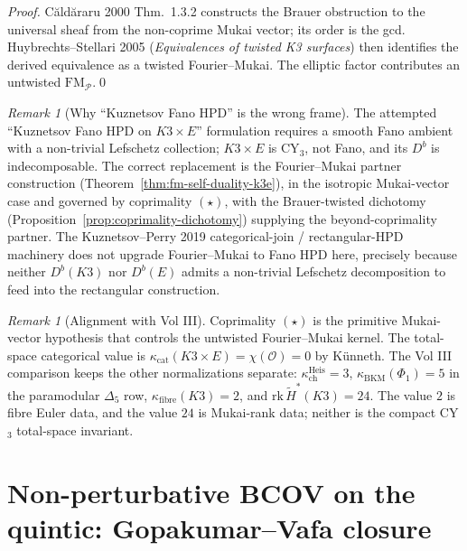\documentclass[12pt]{amsart}
\theoremstyle{remark}
\newtheorem{rmk}[thm]{Remark}
\providecommand{\cO}{\mathcal{O}}
\begin{document}
\begin{proof}
  C\u{a}ld\u{a}raru 2000 Thm.\ 1.3.2 constructs the Brauer obstruction
  to the universal sheaf from the non-coprime Mukai vector; its order
  is the gcd. Huybrechts--Stellari 2005 (\emph{Equivalences of twisted
  K3 surfaces}) then identifies the derived equivalence as a twisted
  Fourier--Mukai. The elliptic factor contributes an untwisted
  $\mathrm{FM}_{\mathcal{P}}$.\qed
\end{proof}

\begin{rmk}[Why ``Kuznetsov Fano HPD'' is the wrong frame]
  The attempted ``Kuznetsov Fano HPD on $K3
  \times E$'' formulation requires a smooth Fano ambient
  with a non-trivial Lefschetz collection; $K3 \times E$ is CY$_3$,
  not Fano, and its $D^b$ is indecomposable. The correct replacement is
  the Fourier--Mukai partner construction
  (Theorem~\ref{thm:fm-self-duality-k3e}), in the isotropic
  Mukai-vector case and governed by coprimality $(\star)$, with the
  Brauer-twisted dichotomy
  (Proposition~\ref{prop:coprimality-dichotomy}) supplying the
  beyond-coprimality partner. The Kuznetsov--Perry 2019
  categorical-join / rectangular-HPD machinery does not upgrade
  Fourier--Mukai to Fano HPD here, precisely because neither
  $D^b(K3)$ nor $D^b(E)$ admits a non-trivial Lefschetz decomposition
  to feed into the rectangular construction.
\end{rmk}

\begin{rmk}[Alignment with Vol III]
  Coprimality $(\star)$ is the primitive Mukai-vector hypothesis that
  controls the untwisted Fourier--Mukai kernel.  The total-space
  categorical value is
  \(\kappa_{\mathrm{cat}}(K3\times E)=\chi(\cO)=0\) by K\"unneth.  The
  Vol III comparison keeps the other normalizations separate:
  \(\kappa_{\mathrm{ch}}^{\mathrm{Heis}}=3\),
  \(\kappa_{\mathrm{BKM}}(\Phi_1)=5\) in the paramodular
  \(\Delta_5\) row, \(\kappa_{\mathrm{fibre}}(K3)=2\), and
  \(\mathrm{rk}\,\widetilde H^*(K3)=24\).  The value \(2\) is fibre
  Euler data, and the value \(24\) is Mukai-rank data; neither is the
  compact CY$_3$ total-space invariant.
\end{rmk}

\section{Non-perturbative BCOV on the quintic: Gopakumar--Vafa closure}
\label{sec:bcov-np-closure}
\end{document}

